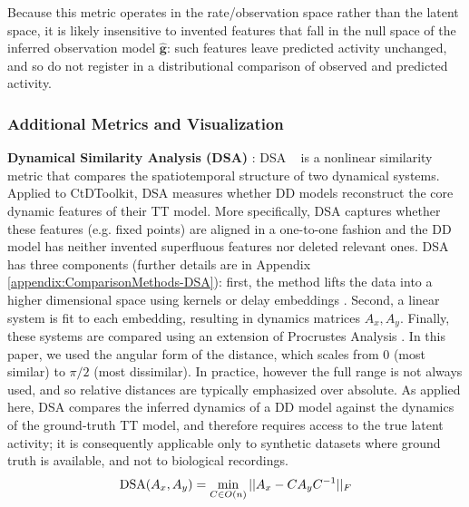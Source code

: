 \documentclass{article}
\begin{document}
Because this metric operates in the rate/observation space rather than the latent space, it is likely insensitive to invented features that fall in the null space of the inferred observation model $\mathbf{\hat{g}}$: such features leave predicted activity unchanged, and so do not register in a distributional comparison of observed and predicted activity.


\vspace{-0.1cm}
\subsubsection{Additional Metrics and Visualization}
\textbf{Dynamical Similarity Analysis (DSA)} :
DSA ~\cite{ostrow_dsa} is a nonlinear similarity metric that compares the spatiotemporal structure of two dynamical systems. Applied to CtDToolkit, DSA measures whether DD models reconstruct the core dynamic features of their TT model. More specifically, DSA captures whether these features (e.g. fixed points) are aligned in a one-to-one fashion and the DD model has neither invented superfluous features nor deleted relevant ones. DSA has three components (further details are in Appendix \ref{appendix:ComparisonMethods-DSA}): first, the method lifts the data into a higher dimensional space using kernels or delay embeddings \cite{brunton_chaos_2017,fujii_dynamic_2019}. Second, a linear system is fit to each embedding, resulting in dynamics matrices $A_x, A_y$. Finally, these systems are compared using an extension of Procrustes Analysis \cite{williams_generalized_2022}. In this paper, we used the angular form of the distance, which scales from $0$ (most similar) to $\pi/2$ (most dissimilar). In practice, however the full range is not always used, and so relative distances are typically emphasized over absolute. As applied here, DSA compares the inferred dynamics of a DD model against the dynamics of the ground-truth TT model, and therefore requires access to the true latent activity; it is consequently applicable only to synthetic datasets where ground truth is available, and not to biological recordings.
\begin{equation}\label{dsanormal}
\textnormal{DSA}(\*A_x,\*A_y) = \min_{\*C \in O(n)}||\*A_x - \*C \*A_y \*C^{-1}||_F
\end{equation}
\end{document}
